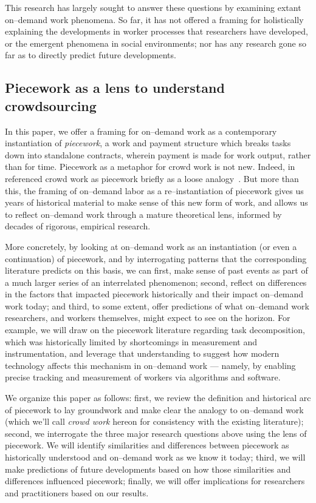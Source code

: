 \documentclass[trackingWork]{subfiles}
\begin{document}
This research has largely sought to answer these questions by examining extant on--demand work phenomena.
So far, it has not offered a framing for holistically explaining
the developments in worker processes that researchers have developed, or
the emergent phenomena in social environments;
nor has any research
gone so far as to directly predict future developments.

\subsection{Piecework as a lens to understand crowdsourcing}
In this paper, we offer a framing for on--demand work as a contemporary instantiation of \textit{piecework},
a work and payment structure which breaks tasks down into standalone contracts,
wherein payment is made for work output, rather than for time.
Piecework as a metaphor for crowd work is not new.
Indeed,
\citeauthor{crowdworkFuture} in \citeyear{crowdworkFuture}
referenced crowd work as piecework briefly
as a loose analogy~\cite{crowdworkFuture}.
But more than this,
the framing of on--demand labor as a re--instantiation of piecework
gives us years of historical material to make sense of this new form of work, and allows us to reflect on--demand work through a mature theoretical lens, informed by decades of rigorous, empirical research.

More concretely, by looking at on--demand work as
an instantiation (or even a continuation) of piecework,
and by interrogating patterns that the corresponding literature predicts
on this basis, we can
first, make sense of past events as part of a much larger series of an interrelated phenomenon;
second, reflect on differences in the factors that impacted piecework historically and their impact on--demand work today;
and third, to some extent, offer predictions of what on--demand work researchers,
and workers themselves,
might expect to see on the horizon.
For example, we will draw on the piecework literature regarding task decomposition,
which was historically limited by shortcomings in measurement and instrumentation, and
leverage that understanding to suggest how modern technology affects this mechanism in on--demand work
--- namely, by enabling precise tracking and measurement of workers via algorithms and software. 


We organize this paper as follows:
first, we review the definition and historical arc of piecework
to lay groundwork and make clear the analogy to on--demand work
(which we'll call \textit{crowd work} hereon
for consistency with the existing literature);
second, we interrogate the three major research questions above using the lens of piecework. 
We will identify similarities and differences between piecework as historically understood and
on--demand work as we know it today;
third, we will make predictions of future developments based on how those similarities and differences influenced piecework;
finally, we will offer implications for researchers and practitioners based on our results.


\end{document}
